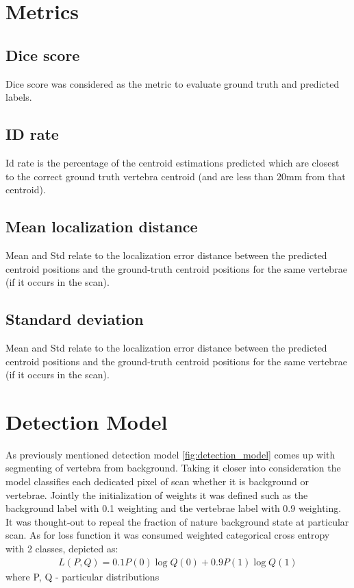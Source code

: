 \section{Metrics}
\subsection{Dice score}
Dice score was considered as the metric to evaluate ground truth and predicted labels.

\subsection{ID rate}
Id rate is the percentage of the centroid estimations predicted which are closest to the correct ground truth vertebra centroid (and are less than 20mm from that centroid).

\subsection{Mean localization distance}
Mean and Std relate to the localization error distance between the predicted centroid positions and the ground-truth centroid positions for the same vertebrae (if it occurs in the scan).

\subsection{Standard deviation}
Mean and Std relate to the localization error distance between the predicted centroid positions and the ground-truth centroid positions for the same vertebrae (if it occurs in the scan).


\section{Detection Model}
As previously mentioned detection model \ref{fig:detection_model} comes up with segmenting of vertebra from background. Taking it closer into consideration the model classifies each dedicated pixel of scan whether it is background or vertebrae. Jointly the initialization of weights it was  defined such as the background label with 0.1 weighting and the vertebrae label with 0.9 weighting. It was thought-out to repeal the fraction of nature background state at particular scan. As for loss function it was consumed \cite{Zhang2018} weighted categorical cross entropy with 2 classes, depicted as:
\begin{align*}
 L(P, Q) = 0.1 P(0)\log Q(0) + 0.9P(1)\log Q(1)
\end{align*}
where P, Q - particular distributions 

